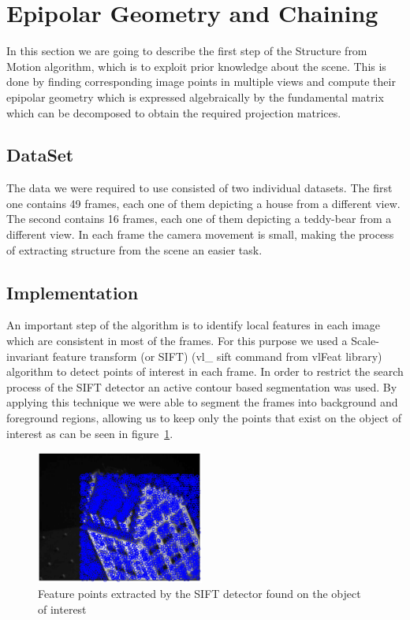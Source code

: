 \section{Epipolar Geometry and Chaining}
\label{egc}
In this section we are going to describe the first step of the Structure from Motion algorithm, which is to exploit prior knowledge about the scene. This is done by finding corresponding image points in multiple views and compute their epipolar geometry which is expressed algebraically by the fundamental matrix which can be decomposed to obtain the required projection matrices.

\subsection{DataSet}
The data we were required to use consisted of two individual datasets. The first one contains 49 frames, each one of them depicting a house from a different view. The second contains 16 frames, each one of them depicting a teddy-bear from a different view. In each frame the camera movement is small, making the process of extracting structure from the scene an easier task.

\subsection{Implementation}
An important step of the algorithm is to identify local features in each image which are consistent in most of the frames. For this purpose we used a Scale-invariant feature transform (or SIFT) (vl\_ sift command from vlFeat library) algorithm to detect points of interest in each frame. In order to restrict the search process of the SIFT detector an active contour based segmentation was used. By applying this technique we were able to segment the frames into background and foreground regions, allowing us to keep only the points that exist on the object of interest as can be seen in figure~\ref{fig:houseBackground}.

\begin{figure}[ht!]
  \centering
    \includegraphics[width=0.49\textwidth]{figures/houseBackground.eps}
    \caption{Feature points extracted by the SIFT detector found on the object of interest}
    \label{fig:houseBackground}
\end{figure}

